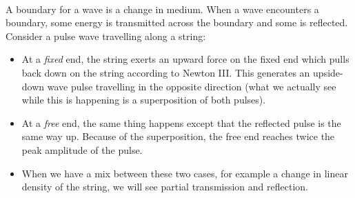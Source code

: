\documentclass[../classical_mechanics.tex]{subfiles}
\begin{document}
        \paragraph{}
        A boundary for a wave is a change in medium.
        When a wave encounters a boundary, some energy is transmitted across the boundary and some is reflected.
        Consider a pulse wave travelling along a string:
        \begin{itemize}
            \item At a \textit{fixed} end, the string exerts an upward force on the fixed end which pulls back down on the string according to Newton III.
            This generates an upside-down wave pulse travelling in the opposite direction (what we actually see while this is happening is a superposition of both pulses).
            \item At a \textit{free} end, the same thing happens except that the reflected pulse is the same way up.
            Because of the superposition, the free end reaches twice the peak amplitude of the pulse.
            \item When we have a mix between these two cases, for example a change in linear density of the string, we will see partial transmission and reflection.
        \end{itemize}
\end{document}
